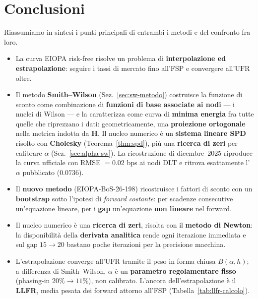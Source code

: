 \documentclass[11pt,a4paper]{article}
\theoremstyle{plain}
\theoremstyle{definition}
\theoremstyle{remark}
\newcommand{\UFR}{\mathrm{UFR}}
\newcommand{\Hmat}{\mathbf{H}}
\begin{document}
\section{Conclusioni}
\label{sec:conclusioni}

Riassumiamo in sintesi i punti principali di entrambi i metodi e del confronto fra loro.

\begin{itemize}
  \item La curva EIOPA risk-free risolve un problema di \textbf{interpolazione ed
        estrapolazione}: seguire i tassi di mercato fino all'FSP e convergere all'$\UFR$ oltre.
  \item Il metodo \textbf{Smith--Wilson} (Sez.~\ref{sec:sw-metodo}) costruisce la funzione di
        sconto come combinazione di \textbf{funzioni di base associate ai nodi} --- i nuclei di
        Wilson --- e la caratterizza come curva di \textbf{minima energia} fra tutte quelle che
        riprezzano i dati: geometricamente, una \textbf{proiezione ortogonale} nella metrica
        indotta da $\Hmat$. Il nucleo numerico \`e un \textbf{sistema lineare SPD} risolto con
        \textbf{Cholesky} (Teorema~\ref{thm:spd}), pi\`u una \textbf{ricerca di zeri} per
        calibrare $\alpha$ (Sez.~\ref{sec:alpha-sw}). La ricostruzione di dicembre~2025
        riproduce la curva ufficiale con RMSE $=0.02$ bps ai nodi DLT e ritrova esattamente
        l'$\alpha$ pubblicato ($0.0736$).
  \item Il \textbf{nuovo metodo} (EIOPA-BoS-26-198) ricostruisce i fattori di sconto con un
        \textbf{bootstrap} sotto l'ipotesi di \emph{forward costante}: per scadenze consecutive
        un'equazione lineare, per i \textbf{gap} un'equazione \textbf{non lineare} nel forward.
  \item Il nucleo numerico \`e una \textbf{ricerca di zeri}, risolta con il \textbf{metodo di
        Newton}: la disponibilit\`a della \textbf{derivata analitica} rende ogni iterazione
        immediata e sul gap $15\!\to\!20$ bastano poche iterazioni per la precisione macchina.
  \item L'estrapolazione converge all'$\UFR$ tramite il peso in forma chiusa $B(\alpha,h)$;
        a differenza di Smith--Wilson, $\alpha$ \`e un \textbf{parametro regolamentare fisso}
        (phasing-in $20\%\!\to\!11\%$), non calibrato. L'ancora dell'estrapolazione \`e il
        \textbf{LLFR}, media pesata dei forward attorno all'FSP (Tabella~\ref{tab:llfr-calcolo}).

\end{itemize}
\end{document}

